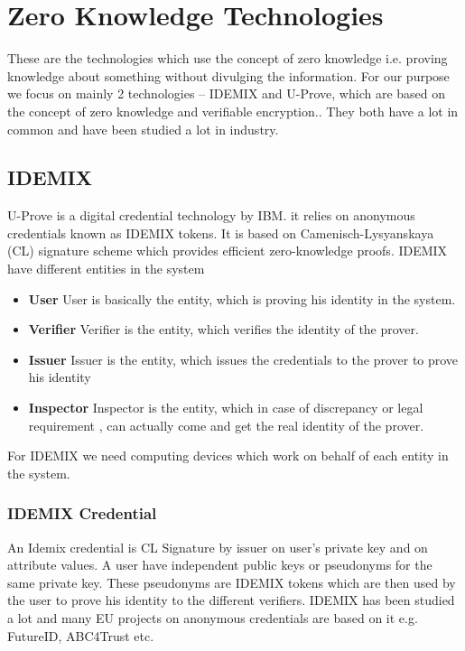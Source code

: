 \section{Zero Knowledge Technologies}
These are the technologies which use the concept of zero knowledge i.e. proving knowledge about something without divulging the information. For our purpose we focus on mainly 2 technologies – IDEMIX and U-Prove, which are based on the concept of zero knowledge and verifiable encryption.. They both have a lot in common and have been studied a lot in industry. 
\subsection{IDEMIX}
U-Prove is a digital credential technology by IBM. it relies on anonymous credentials known as IDEMIX tokens. It is based on Camenisch-Lysyanskaya (CL) signature scheme which provides efficient zero-knowledge proofs. IDEMIX  have different entities in the system
\begin{itemize}
	\item \textbf{User} User is basically the entity, which is proving his identity in the system.
	\item \textbf{Verifier} Verifier is the entity, which verifies the identity of the prover.
	\item \textbf{Issuer} Issuer is the entity, which issues the credentials to the prover to prove his identity
	\item \textbf{Inspector} Inspector is the entity, which in case of discrepancy or legal requirement , can actually come and get the real identity of the prover.
\end{itemize}
For IDEMIX we need computing devices which work on behalf of each entity in the system.
\subsubsection{IDEMIX Credential}
An Idemix credential is CL Signature by issuer on user's private key and on attribute values. A user have independent public keys or pseudonyms for the same private key. These pseudonyms are IDEMIX tokens which are then used by the user to prove his identity to the different verifiers. IDEMIX has been studied a lot and many EU projects on anonymous credentials are based on it e.g. FutureID, ABC4Trust etc.
